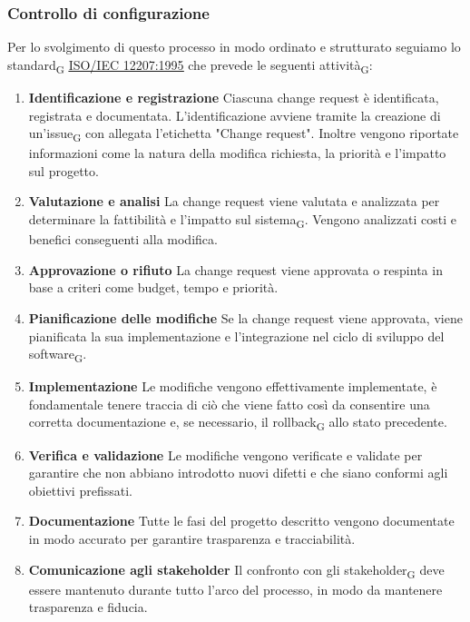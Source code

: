 \subsubsection{Controllo di configurazione}
Per lo svolgimento di questo processo in modo ordinato e strutturato seguiamo lo standard\textsubscript{G}
\href{https://www.math.unipd.it/~tullio/IS-1/2009/Approfondimenti/ISO_12207-1995.pdf}{\underline{ISO/IEC 12207:1995}}
che prevede le seguenti {attività\textsubscript{G}}:
\begin{enumerate}
    \item \textbf{Identificazione e registrazione} Ciascuna change request è identificata, registrata e documentata. L'identificazione avviene
    tramite la creazione di un'{issue\textsubscript{G}} con allegata l'etichetta "Change request".
    Inoltre vengono riportate informazioni come la natura della modifica richiesta, la priorità e l'impatto sul progetto.
    \item \textbf{Valutazione e analisi} La change request viene valutata e analizzata per determinare la fattibilità e l'impatto sul 
    {sistema\textsubscript{G}}. Vengono analizzati costi e benefici conseguenti alla modifica.
    \item \textbf{Approvazione o rifiuto} La change request viene approvata o respinta in base a criteri come budget, tempo e priorità.
    \item \textbf{Pianificazione delle modifiche} Se la change request viene approvata, viene pianificata la sua implementazione e l'integrazione 
    nel ciclo di sviluppo del {software\textsubscript{G}}.
    \item \textbf{Implementazione} Le modifiche vengono effettivamente implementate, è fondamentale tenere traccia di ciò che viene fatto così
    da consentire una corretta documentazione e, se necessario, il {rollback\textsubscript{G}} allo stato precedente.
    \item \textbf{Verifica e validazione} Le modifiche vengono verificate e validate per garantire che non abbiano introdotto nuovi difetti
    e che siano conformi agli obiettivi prefissati.
    \item \textbf{Documentazione} Tutte le fasi del progetto descritto vengono documentate in modo accurato per garantire trasparenza e
    tracciabilità.
    \item \textbf{Comunicazione agli stakeholder} Il confronto con gli {stakeholder\textsubscript{G}} deve essere mantenuto
    durante tutto l'arco del processo, in modo da mantenere trasparenza e fiducia.
\end{enumerate}

